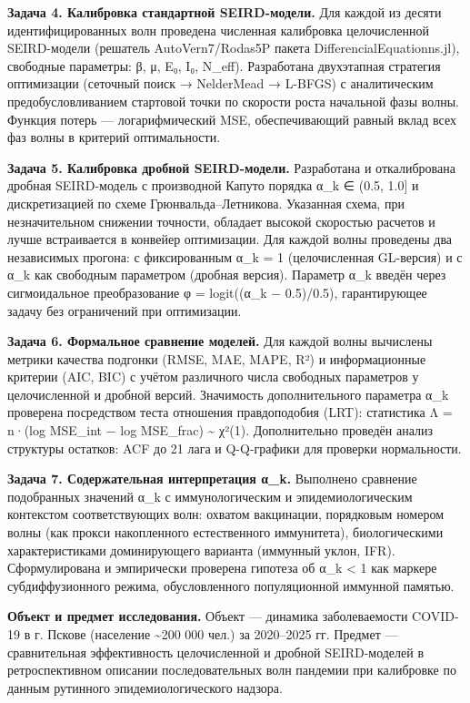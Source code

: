 \documentclass[12pt]{article}
\begin{document}
\textbf{Задача 4. Калибровка стандартной SEIRD-модели.} Для каждой из
десяти идентифицированных волн проведена численная калибровка
целочисленной SEIRD-модели (решатель AutoVern7/Rodas5P пакета
DifferencialEquationns.jl), свободные параметры: β, μ, E₀, I₀, N\_eff).
Разработана двухэтапная стратегия оптимизации (сеточный поиск →
NelderMead → L-BFGS) с аналитическим предобусловливанием стартовой точки
по скорости роста начальной фазы волны. Функция потерь ---
логарифмический MSE, обеспечивающий равный вклад всех фаз волны в
критерий оптимальности.

\textbf{Задача 5. Калибровка дробной SEIRD-модели.} Разработана и
откалибрована дробная SEIRD-модель с производной Капуто порядка α\_k ∈
(0.5, 1.0{]} и дискретизацией по схеме Грюнвальда--Летникова. Указанная
схема, при незначительном снижении точности, обладает высокой скоростью
расчетов и лучше встраивается в конвейер оптимизации. Для каждой волны
проведены два независимых прогона: с фиксированным α\_k = 1
(целочисленная GL-версия) и с α\_k как свободным параметром (дробная
версия). Параметр α\_k введён через сигмоидальное преобразование φ =
logit((α\_k − 0.5)/0.5), гарантирующее задачу без ограничений при
оптимизации.

\textbf{Задача 6. Формальное сравнение моделей.} Для каждой волны
вычислены метрики качества подгонки (RMSE, MAE, MAPE, R²) и
информационные критерии (AIC, BIC) с учётом различного числа свободных
параметров у целочисленной и дробной версий. Значимость дополнительного
параметра α\_k проверена посредством теста отношения правдоподобия
(LRT): статистика Λ = n·(log MSE\_int − log MSE\_frac) \textasciitilde{}
χ²(1). Дополнительно проведён анализ структуры остатков: ACF до 21 лага
и Q-Q-графики для проверки нормальности.

\textbf{Задача 7. Содержательная интерпретация α\_k.} Выполнено
сравнение подобранных значений α\_k с иммунологическим и
эпидемиологическим контекстом соответствующих волн: охватом вакцинации,
порядковым номером волны (как прокси накопленного естественного
иммунитета), биологическими характеристиками доминирующего варианта
(иммунный уклон, IFR). Сформулирована и эмпирически проверена гипотеза
об α\_k \textless{} 1 как маркере субдиффузионного режима,
обусловленного популяционной иммунной памятью.

\textbf{Объект и предмет исследования.} Объект --- динамика
заболеваемости COVID-19 в г. Пскове (население \textasciitilde200 000
чел.) за 2020--2025 гг. Предмет --- сравнительная эффективность
целочисленной и дробной SEIRD-моделей в ретроспективном описании
последовательных волн пандемии при калибровке по данным рутинного
эпидемиологического надзора.
\end{document}
